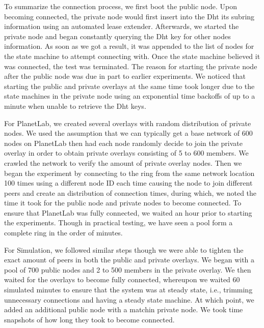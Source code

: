 \documentclass[conference]{IEEEtran}
\begin{document}
To summarize the connection process, we first boot the public node.  Upon
becoming connected, the private node would first insert into the Dht its 
subring information using an automated lease extender.  Afterwards, we
started the private node and began constantly querying the Dht key for other
nodes information.  As soon as we got a result, it was appended to the list of
nodes for the state machine to attempt connecting with.  Once the state machine
believed it was connected, the test was terminated.  The reason for starting
the private node after the public node was due in part to earlier experiments.
We noticed that starting the public and private overlays at the same time took
longer due to the state machines in the private node using an exponential time
backoffs of up to a minute when unable to retrieve the Dht keys.

For PlanetLab, we created several overlays with random distribution of private
nodes.  We used the assumption that we can typically get a base network of
600 nodes on PlanetLab then had each node randomly decide to join the private
overlay in order to obtain private overlays consisting of 5 to 600 members.  We
crawled the network to verify the amount of private overlay nodes.  Then we began
the experiment by connecting to the ring from the same network location 100 times
using a different node ID each time causing the node to join different peers and
create an distribution of connection times, during which, we noted the time it
took for the public node and private nodes to become connected.  To ensure that
PlanetLab was fully connected, we waited an hour prior to starting the
experiments.  Though in practical testing, we have seen a pool form a complete
ring in the order of minutes.

For Simulation, we followed similar steps though we were able to tighten the
exact amount of peers in both the public and private overlays.  We began with a
pool of 700 public nodes and 2 to 500 members in the private overlay.  We then
waited for the overlays to become fully connected, whereupon we waited 60
simulated minutes to ensure that the system was at steady state, i.e., trimming
unnecessary connections and having a steady state machine.  At which point, we
added an additional public node with a matchin private node.  We took time
snapshots of how long they took to become connected.
\end{document}
